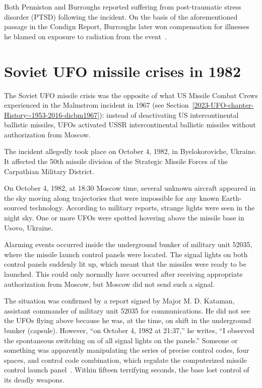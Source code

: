 Both Penniston and Burroughs reported suffering from post-traumatic stress disorder (PTSD) following the incident.
On the basis of the aforementioned passage in the Condign Report, Burroughs later won compensation for illnesses he blamed on exposure to radiation from the event~\cite{Potter2022Sep}.


\section{Soviet UFO missile crises in 1982}

\label{2023-UFO-chapter-History--1953-2016-sumc}

The Soviet UFO missile crisis was the opposite of what US Missile Combat Crews experienced in the Malmstrom incident in 1967
(see Section~\ref{2023-UFO-chapter-History--1953-2016-dicbm1967}): instead of deactivating US intercontinental ballistic missiles,
UFOs activated USSR intercontinental ballistic missiles without authorization from Moscow.


The incident allegedly took place on October 4, 1982, in Byelokoroviche, Ukraine.
It affected the 50th missile division of the Strategic Missile Forces of the Carpathian Military District.

On October 4, 1982, at 18:30 Moscow time, several unknown aircraft appeared in the sky
moving along trajectories that were impossible for any known Earth-sourced technology.
According to military reports, strange lights were seen in the night sky.
One or more UFOs were spotted hovering above the missile base in Usovo, Ukraine.

Alarming events occurred inside the underground bunker of military unit 52035,
where the missile launch control panels were located.
The signal lights on both control panels suddenly lit up,
which meant that the missiles were ready to be launched.
This could only normally have occurred after receiving appropriate authorization from Moscow,
but Moscow did not send such a signal.

The situation was confirmed by a report signed by Major M. D. Kataman,
assistant commander of military unit 52035 for communications.
He did not see the UFOs flying above because he was, at the time, on shift in the underground bunker (capsule).
However, ``on October 4, 1982 at 21:37,'' he writes, ``I observed the spontaneous switching on of all signal lights on the panels.''
Someone or something was apparently manipulating the series of precise control codes, four spaces,
and control code combination, which regulate the computerized missile control launch panel~\cite{Huneeus2011Jan}.
Within fifteen terrifying seconds, the base lost control of its deadly weapons.

